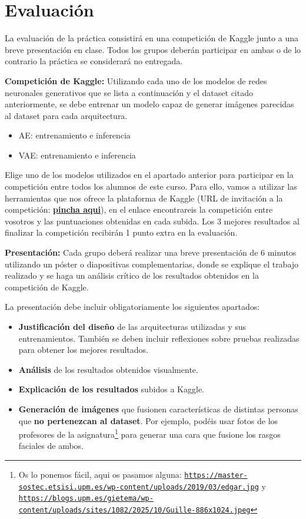 \documentclass[a4paper]{article}
\begin{document}
\section{Evaluación}
La evaluación de la práctica consistirá en una competición de Kaggle junto a una breve presentación en clase. Todos los grupos deberán participar en ambas o de lo contrario la práctica se considerará no entregada.

\textbf{Competición de Kaggle:} Utilizando cada uno de los modelos de redes neuronales generativos que se lista a continuación y el dataset citado anteriormente, se debe entrenar un modelo capaz de generar imágenes parecidas al dataset para cada arquitectura.
\begin{itemize}
    \item \gls{AE}: entrenamiento e inferencia
    \item \gls{VAE}: entrenamiento e inferencia
\end{itemize}

Elige uno de los modelos utilizados en el apartado anterior para participar en la competición entre todos los alumnos de este curso. Para ello, vamos a utilizar las herramientas que nos ofrece la plataforma de Kaggle (URL de invitación a la competición: \href{https://www.kaggle.com/t/313d806078e46a21725d1e3ce786c35f}{\textbf{pincha aqui}}), en el enlace encontrareis la competición entre vosotros y las puntuaciones obtenidas en cada subida. Los 3 mejores resultados al finalizar la competición recibirán 1 punto extra en la evaluación.

\textbf{Presentación:} Cada grupo deberá realizar una breve presentación de 6 minutos utilizando un póster o diapositivas complementarias, donde se explique el trabajo realizado y se haga un análisis crítico de los resultados obtenidos en la competición de Kaggle.

La presentación debe incluir obligatoriamente los siguientes apartados:
\begin{itemize}
    \item \textbf{Justificación del diseño} de las arquitecturas utilizadas y sus entrenamientos. También se deben incluir reflexiones sobre pruebas realizadas para obtener los mejores resultados.
    \item \textbf{Análisis} de los resultados obtenidos visualmente.
    \item \textbf{Explicación de los resultados} subidos a Kaggle.
    \item \textbf{Generación de imágenes} que fusionen características de distintas personas que \textbf{no pertenezcan al dataset}. Por ejemplo, podéis usar fotos de los profesores de la asignatura\footnote{Os lo ponemos fácil, aqui os pasamos alguna: \href{https://master-sostec.etsisi.upm.es/wp-content/uploads/2019/03/edgar.jpg}{\nolinkurl{https://master-sostec.etsisi.upm.es/wp-content/uploads/2019/03/edgar.jpg}} y \href{https://blogs.upm.es/gietema/wp-content/uploads/sites/1082/2025/10/Guille-886x1024.jpeg}{\nolinkurl{https://blogs.upm.es/gietema/wp-content/uploads/sites/1082/2025/10/Guille-886x1024.jpeg}}} para generar una cara que fusione los rasgos faciales de ambos.
\end{itemize}
\end{document}
